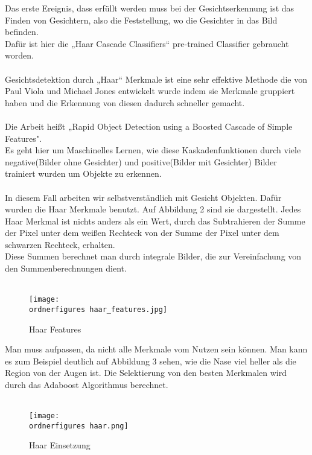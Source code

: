 Das erste Ereignis, dass erfüllt werden muss bei der Gesichtserkennung ist das Finden von Gesichtern, also die Feststellung, wo die Gesichter in das Bild befinden. \\ 
Dafür ist hier die „Haar Cascade Classifiers“  pre-trained Classifier gebraucht worden. \\ \\
Gesichtsdetektion durch „Haar“ Merkmale ist eine sehr effektive Methode die von Paul Viola und Michael Jones entwickelt wurde indem sie Merkmale gruppiert haben und die Erkennung von diesen dadurch schneller gemacht. \\ \\
Die Arbeit heißt „Rapid Object Detection using a Boosted Cascade of Simple Features".\\

Es geht hier um Maschinelles Lernen, wie diese Kaskadenfunktionen durch viele negative(Bilder ohne Gesichter) und positive(Bilder mit Gesichter) Bilder trainiert wurden um Objekte zu erkennen.\\ \\
In diesem Fall  arbeiten wir selbstverständlich mit Gesicht Objekten. 
Dafür wurden die Haar Merkmale benutzt. Auf Abbildung 2 sind sie dargestellt. Jedes Haar Merkmal ist nichts anders als ein Wert, durch das Subtrahieren der Summe der Pixel unter dem weißen Rechteck von der Summe der Pixel unter dem schwarzen Rechteck, erhalten. \\
Diese Summen berechnet man durch integrale Bilder, die zur Vereinfachung von den Summenberechnungen dient.\\ \\
\cite{Viola01robustreal-time}

\begin{figure}[H]
	\texttt{[image: \\ordnerfigures haar\_features.jpg]}
	\caption{Haar Features}
	\label{fig:haar features}
\end{figure}\cite{Viola01robustreal-time}

Man muss aufpassen, da nicht alle Merkmale vom Nutzen sein können. Man kann es zum Beispiel deutlich auf Abbildung 3 sehen, wie die Nase viel heller als die Region von der Augen ist. Die Selektierung von den besten Merkmalen wird durch das Adaboost Algorithmus berechnet. \\\\
\begin{figure}[H]
	\texttt{[image: \\ordnerfigures haar.png]}
	\caption{Haar Einsetzung}
	\label{fig:haar}
\end{figure}\cite{Viola01robustreal-time}

